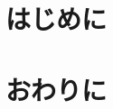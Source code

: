 \documentclass[a4paper,11pt,luatex]{ltjsarticle}
\begin{document}
\maketitle

\section*{はじめに}



\section*{おわりに}

\nocite{*}


\end{document}

